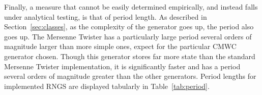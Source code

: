 

Finally, a measure that cannot be easily determined empirically, and instead falls under analytical testing, is that of period length. As described in Section~\ref{sec:classes}, as the complexity of the generator goes up, the period also goes up. The Mersenne Twister has a particularly large period several orders of magnitude larger than more simple ones, expect for the particular CMWC generator chosen. Though this generator stores far more state than the standard Mersenne Twister implementation, it is significantly faster and has a period several orders of magnitude greater than the other generators. Period lengths for implemented RNGS are displayed tabularly in Table~\ref{tab:period}.


